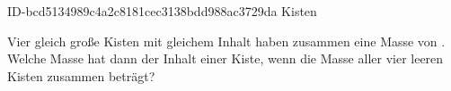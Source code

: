 \begin{exercise}
      {ID-bcd5134989c4a2c8181cec3138bdd988ac3729da}
      {Kisten}
  \ifproblem\problem\par
    Vier gleich große Kisten mit gleichem Inhalt haben zusammen eine Masse
    von . Welche Masse hat dann der Inhalt einer Kiste, wenn die
    Masse aller vier leeren Kisten zusammen  beträgt?
  \fi
\end{exercise}
